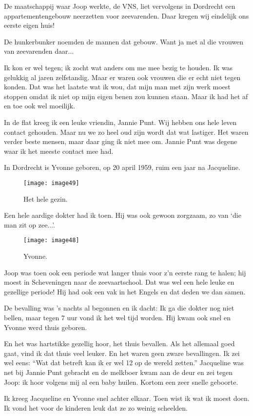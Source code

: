 De maatschappij waar Joop werkte, de VNS, liet vervolgens in Dordrecht een appartementengebouw neerzetten voor zeevarenden. Daar kregen wij eindelijk ons eerste eigen huis! 

De hunkerbunker noemden de mannen dat gebouw. Want ja met al die vrouwen van zeevarenden daar...

Ik kon er wel tegen; ik zocht wat anders om me mee bezig te houden. Ik was gelukkig al jaren zelfstandig. Maar er waren ook vrouwen die er echt niet tegen konden. Dat was het laatste wat ik wou, dat mijn man met zijn werk moest stoppen omdat ik niet op mijn eigen benen zou kunnen staan. Maar ik had het af en toe ook wel moeilijk.

In de flat kreeg ik een leuke vriendin, Jannie Punt. Wij hebben ons hele leven contact gehouden. Maar nu we zo heel oud zijn wordt dat wat lastiger. Het waren verder beste mensen, maar daar ging ik niet mee om. Jannie Punt was degene waar ik het meeste contact mee had.

In Dordrecht is Yvonne geboren, op 20 april 1959, ruim een jaar na Jacqueline.

\begin{figure}[h]
    \begin{centering}
    \texttt{[image: image49]}
    \caption{Het hele gezin.}
    \end{centering}
\end{figure}

Een hele aardige dokter had ik toen. Hij was ook gewoon zorgzaam, zo van ‘die man zit op zee...’.

\begin{figure}[h]
    \texttt{[image: image48]}
    \caption{Yvonne.}
\end{figure}

Joop was toen ook een periode wat langer thuis voor z’n eerste rang te halen; hij moest in Scheveningen naar de zeevaartschool. Dat was wel een hele leuke en gezellige periode! Hij had ook een vak in het Engels en dat deden we dan samen. 

De bevalling was ’s nachts al begonnen en ik dacht: Ik ga die dokter nog niet bellen, maar tegen 7 uur vond ik het wel tijd worden. Hij kwam ook snel en Yvonne werd thuis geboren. 

En het was hartstikke gezellig hoor, het thuis bevallen. Als het allemaal goed gaat, vind ik dat thuis veel leuker. En het waren geen zware bevallingen. Ik zei wel eens: ``Wat dat betreft kan ik er wel 12 op de wereld zetten.'' Jacqueline was net bij Jannie Punt gebracht en de melkboer kwam aan de deur en zei tegen Joop: ik hoor volgens mij al een baby huilen. Kortom een zeer snelle geboorte.

Ik kreeg Jacqueline en Yvonne snel achter elkaar. Toen wist ik wat ik moest doen. Ik vond het voor de kinderen leuk dat ze zo weinig scheelden.